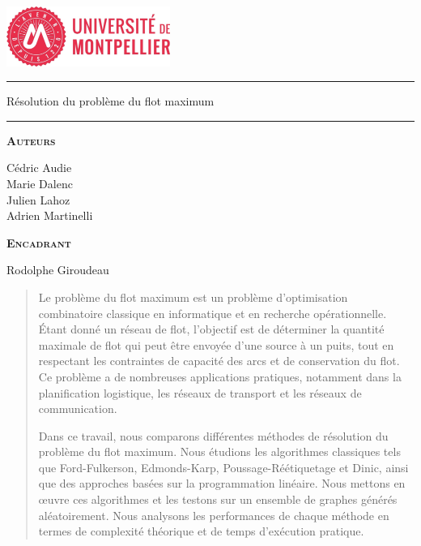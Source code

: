 \documentclass[a4paper]{article}
\begin{document}
\begin{center}
\vspace{2cm}
\includegraphics[width=0.4\textwidth]{UM1.jpg}~\\[1cm]
\vspace{2cm}

\hrule
\vspace{.5cm}
{\huge\bfseries{Résolution du problème du flot maximum\par}} %
\vspace{.5cm}

\hrule
\vspace{1.5cm}

\textsc{\textbf{Auteurs}}\\
\vspace{.5cm}
\centering

Cédric Audie\\
Marie Dalenc\\
Julien Lahoz\\
Adrien Martinelli


\vspace{1cm}

\textsc{\textbf{Encadrant}}\\
\vspace{.5cm}
\centering

Rodolphe Giroudeau

\vspace{4cm}

\centering {} %
\end{center}
\newpage
\begin{abstract}	
Le problème du flot maximum est un problème d'optimisation combinatoire classique en informatique et en recherche opérationnelle. Étant donné un réseau de flot, l'objectif est de déterminer la quantité maximale de flot qui peut être envoyée d'une source à un puits, tout en respectant les contraintes de capacité des arcs et de conservation du flot. Ce problème a de nombreuses applications pratiques, notamment dans la planification logistique, les réseaux de transport et les réseaux de communication. 

Dans ce travail, nous comparons différentes méthodes de résolution du problème du flot maximum.  Nous étudions les algorithmes classiques tels que Ford-Fulkerson, Edmonds-Karp, Poussage-Réétiquetage et Dinic, ainsi que des approches basées sur la programmation linéaire. Nous mettons en œuvre ces algorithmes et les testons sur un ensemble de graphes générés aléatoirement. Nous analysons les performances de chaque méthode en termes de complexité théorique et de temps d'exécution pratique. 
\end{abstract}
\newpage
{\hypersetup{hidelinks}
\tableofcontents
}
\newpage
\pagestyle{headings}
\end{document}
